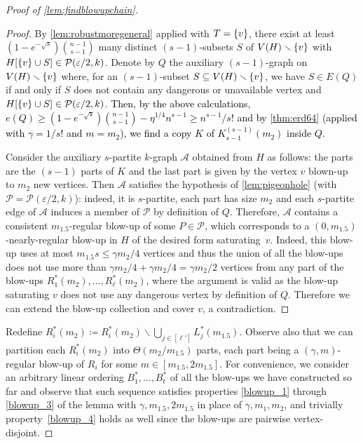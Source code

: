\documentclass[12pt,reqno]{amsart}
\theoremstyle{plain}
\theoremstyle{definition}
\numberwithin{equation}{section}
\newcommand{\fw}[1]{\textcolor{black}{#1}}
\DeclarePairedDelimiter{\set}{\{}{\}}
\renewcommand{\ge}{\geqslant}
\renewcommand{\le}{\leqslant}
\renewcommand{\setminus}{\smallsetminus}
\newcommand{\eps}{\varepsilon}
\begin{document}
\begin{proof}[Proof of \cref{lem:findblowupchain}]
\begin{proof}
			
			By \cref{lem:robustmoregeneral} applied with $T=\set{v}$,
			there exist at least $(1-e^{-\sqrt{s}})\binom{n-1}{s-1}$ many distinct $(s-1)$-subsets $S$ of $V(H) \setminus \set{v}$ with $H[\set{v} \cup S]\in \mathcal{P}(\eps/2,k)$. Denote by $Q$ the auxiliary $(s-1)$-graph on $V(H) \setminus \set{v}$ where, for an $(s-1)$-subset $S \subseteq V(H) \setminus \set{v}$, we have $S \in E(Q)$ if and only if $S$ does not contain any dangerous or unavailable vertex and $H[\set{v} \cup S]\in \mathcal{P}(\eps/2,k)$.
			\fw{Then, by the above calculations, $e(Q) \ge (1-e^{-\sqrt{s}}) \binom{n-1}{s-1} - \eta^{1/4} n^{s-1} \ge n^{s-1}/s!$ and by \cref{thm:erd64} (applied with $\gamma=1/s!$ and $m=m_2$), we find a copy $K$ of $K_{s-1}^{(s-1)}(m_2)$ inside $Q$.}
			
			Consider the auxiliary $s$-partite $k$-graph $\mathcal{A}$ obtained from $H$ as follows: the parts are the $(s-1)$ parts of $K$ and the last part is given by the vertex $v$ blown-up to $m_2$ new vertices.
			Then $\mathcal{A}$ satisfies the hypothesis of \cref{lem:pigeonhole} (with $\mathcal{P}=\mathcal{P}(\eps/2,k)$): indeed, it is $s$-partite, each part has size $m_2$ and each $s$-partite edge of $\mathcal{A}$ induces a member of $\mathcal{P}$ by definition of $Q$.
			Therefore, $\mathcal{A}$ contains a consistent $m_{1.5}$-regular blow-up of some $P \in \mathcal{P}$, which corresponds to a $(0,m_{1.5})$-nearly-regular blow-up in $H$ of the desired form saturating~$v$. Indeed, this blow-up uses at most $m_{1.5}s \le \gamma m_2/4$ vertices and thus the union of all the blow-ups does not use more than $\gamma m_2/4+\gamma m_2/4=\gamma m_2/2$ vertices from any part of the blow-ups $R_1^\ast(m_2), \dots, R_{\ell}^\ast(m_2)$, where the argument is valid as the blow-up saturating $v$ does not use any dangerous vertex by definition of $Q$. Therefore we can extend the blow-up collection and cover $v$, a contradiction.
		\end{proof}
		
		Redefine $R_i^\ast(m_2) \coloneqq R_i^\ast(m_2)\setminus \bigcup_{j\in [\ell']} L_j^\ast(m_{1.5})$. Observe also that we can partition each $R_i^\ast(m_2)$ into $\Theta(m_2/m_{1.5})$ parts, each part being a $(\gamma, m)$-regular blow-up of $R_i$ for some $m\in [m_{1.5},2m_{1.5}]$. For convenience, we consider an arbitrary linear ordering $B_1^\ast, \dotsc, B_t^\ast$ of all the blow-ups we have constructed so far and observe that such sequence satisfies properties \ref{blowup_1} through \ref{blowup_3} of the lemma with $\gamma, m_{1.5}, 2m_{1.5}$ in place of $\gamma, m_1,m_2$, and trivially property~\ref{blowup_4} holds as well since the blow-ups are pairwise vertex-disjoint.
		

\end{proof}
\end{document}
